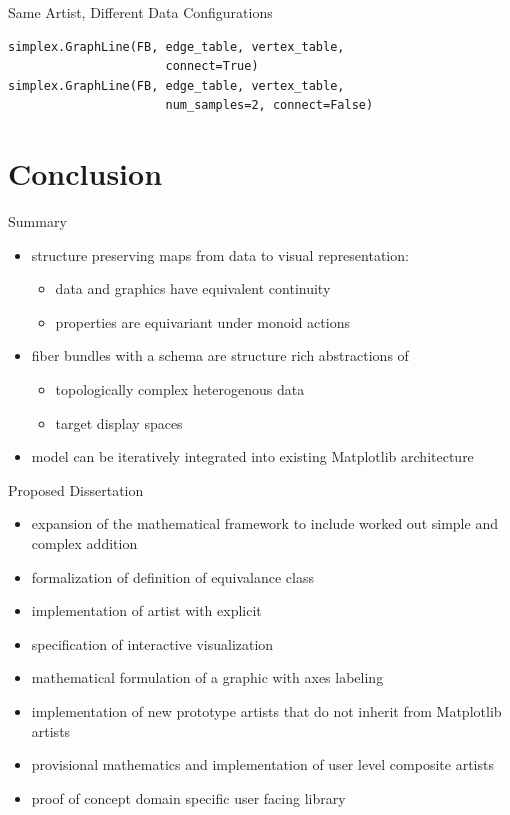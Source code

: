 \documentclass[xcolor={dvipsnames}, handout]{beamer}
\begin{document}
\begin{frame}[fragile]{Same Artist, Different Data Configurations}
\begin{figure}[H]
\begin{subfigure}{0.49\textwidth}
        \end{subfigure}
    \end{figure}
\begin{verbatim}
simplex.GraphLine(FB, edge_table, vertex_table, 
                      connect=True)
simplex.GraphLine(FB, edge_table, vertex_table, 
                      num_samples=2, connect=False)
\end{verbatim}
\end{frame}

\section{Conclusion}
\begin{frame}{Summary}
    \begin{itemize}
        \item structure preserving maps from data to visual representation:
            \begin{itemize}
                \item data and graphics have equivalent continuity
                \item properties are equivariant under monoid actions
            \end{itemize}  
        \item fiber bundles with a schema are structure rich abstractions of 
            \begin{itemize}
                \item topologically complex heterogenous data 
                \item target display spaces
            \end{itemize}
        \item model can be iteratively integrated into existing Matplotlib architecture
    \end{itemize}
\end{frame}

\begin{frame}{Proposed Dissertation}
\begin{itemize}
    \item expansion of the mathematical framework to include worked out simple and complex addition
    \item formalization of definition of equivalance class \vartisteq
    \item implementation of artist with explicit \vindex\
    \item specification of interactive visualization
    \item mathematical formulation of a graphic with axes labeling
    \item implementation of new prototype artists that do not inherit from Matplotlib artists
    \item provisional mathematics and implementation of user level composite artists
    \item proof of concept domain specific user facing library 
\end{itemize}
\end{frame}
\end{document}
